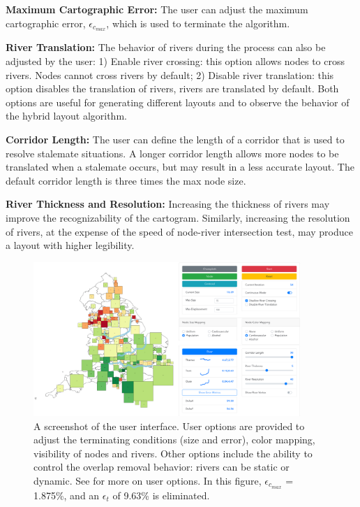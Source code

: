 \documentclass[Afour,sagev,times]{sagej}
\newcommand{\bobgraph}[1]{\noindent\textbf{#1}}
\newcommand{\nodeError}{\epsilon}
\newcommand{\nodeCartographicErrorMax}{\nodeError_{c_{max}}}
\newcommand{\nodeTopologicalError}{\nodeError_{t}}
\begin{document}
\bobgraph{Maximum Cartographic Error:} The user can adjust the maximum cartographic error, $ \nodeCartographicErrorMax $, which is used to terminate the algorithm.

\bobgraph{River Translation:} The behavior of rivers during the process can also be adjusted by the user: 1) Enable river crossing: this option allows nodes to cross rivers. Nodes cannot cross rivers by default; 2) Disable river translation: this option disables the translation of rivers, rivers are translated by default. Both options are useful for generating different layouts and to observe the behavior of the hybrid layout algorithm.

\bobgraph{Corridor Length:} The user can define the length of a corridor that is used to resolve stalemate situations. A longer corridor length allows more nodes to be translated when a stalemate occurs, but may result in a less accurate layout. The default corridor length is three times the max node size.

\bobgraph{River Thickness and Resolution:} Increasing the thickness of rivers may improve the recognizability of the cartogram. Similarly, increasing the resolution of rivers, at the expense of the speed of node-river intersection test, may produce a layout with higher legibility.

    {
        \begin{figure}[tb!]
            \centering
            \includegraphics[width=0.9\textwidth,keepaspectratio]{UI.png}
            \caption{A screenshot of the user interface. User options are provided to adjust the terminating conditions (size and error), color mapping, visibility of nodes and rivers. Other options include the ability to control the overlap removal behavior: rivers can be static or dynamic. See  for more on user options. In this figure, $ \nodeCartographicErrorMax $ = 1.875\%, and an $ \nodeTopologicalError $ of 9.63\% is eliminated.}
            \label{fig:overview}
        \end{figure}
    }
\end{document}
